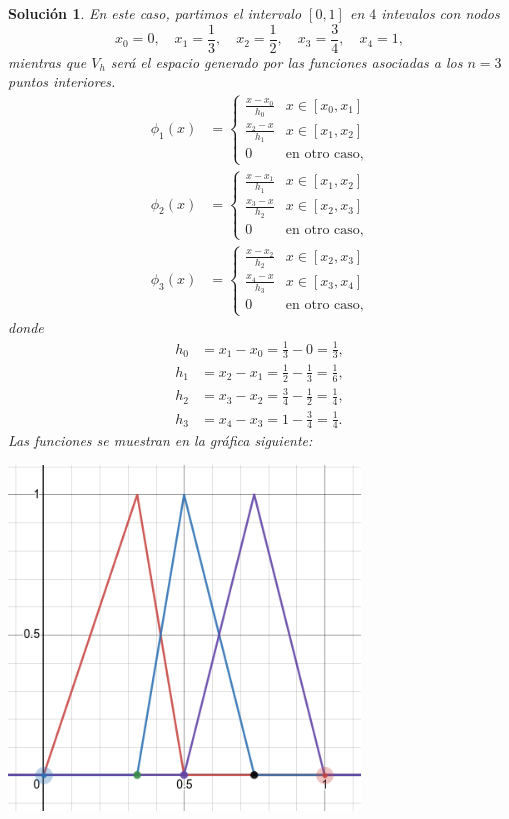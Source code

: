 \documentclass[11pt]{article}
\newtheorem*{sol}{Solución}
\newcommand\<{\langle}
\renewcommand\>{\rangle}
\begin{document}
\begin{sol}
  En este caso, partimos el intervalo $[0,1]$ en $4$ intevalos con
  nodos 
  \begin{equation}
    x_0=0,
    \quad
    x_1=\frac{1}{3},
    \quad
    x_2=\frac{1}{2},
    \quad
    x_3=\frac{3}{4},
    \quad
    x_4=1
  ,\end{equation}
  mientras que $V_h$ será el espacio generado por las funciones
  asociadas a los $n=3$ puntos interiores.
  \begin{align}
    \phi_1(x)
    &=
    \begin{cases}
      \frac{x-x_0}{h_0} & x\in[x_0,x_1] \\
      \frac{x_2-x}{h_1} & x\in[x_1,x_2] \\
      0 & \text{en otro caso},
    \end{cases}
    \\
    \phi_2(x)
    &=
    \begin{cases}
      \frac{x-x_1}{h_1} & x\in[x_1,x_2] \\
      \frac{x_3-x}{h_2} & x\in[x_2,x_3] \\
      0 & \text{en otro caso},
    \end{cases}
    \\
    \phi_3(x)
    &=
    \begin{cases}
      \frac{x-x_2}{h_2} & x\in[x_2,x_3] \\
      \frac{x_4-x}{h_3} & x\in[x_3,x_4] \\
      0 & \text{en otro caso},
    \end{cases}
  \end{align}
  donde
  \begin{align}
    h_0&=x_1-x_0=\frac{1}{3}-0 = \frac{1}{3}, \\
    h_1&=x_2-x_1=\frac{1}{2}-\frac{1}{3}=\frac{1}{6}, \\
    h_2&=x_3-x_2=\frac{3}{4}-\frac{1}{2}=\frac{1}{4}, \\
    h_3&=x_4-x_3=1-\frac{3}{4}=\frac{1}{4}
  .\end{align}
  Las funciones se muestran en la gráfica siguiente:
  \begin{center}
  \includegraphics[width=0.7\textwidth]{img/phis}

\end{center}
\end{sol}
\end{document}
